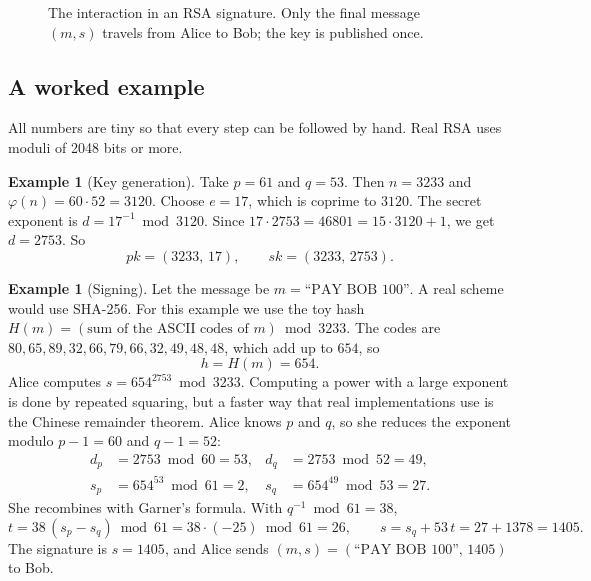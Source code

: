 \documentclass[11pt,a4paper]{article}
\theoremstyle{definition}
\newtheorem{example}[definition]{Example}
\newcommand{\sk}{\mathit{sk}}
\newcommand{\pk}{\mathit{pk}}
\newcommand{\Hash}{H}
\newcommand{\inv}[1]{#1^{-1}}
\begin{document}
\begin{figure}[h]
\centering
{}
\caption{The interaction in an RSA signature. Only the final message $(m,s)$ travels from Alice to Bob; the key is published once.}
\end{figure}

\subsection{A worked example}

All numbers are tiny so that every step can be followed by hand. Real RSA uses moduli of 2048 bits or more.

\begin{example}[Key generation]\label{ex:rsakey}
Take $p=61$ and $q=53$. Then $n=3233$ and $\varphi(n)=60\cdot 52=3120$. Choose $e=17$, which is coprime to $3120$. The secret exponent is $d=\inv{17} \bmod 3120$. Since $17\cdot 2753 = 46801 = 15\cdot 3120 + 1$, we get $d=2753$. So
\[
\pk=(3233,\,17),\qquad \sk=(3233,\,2753).
\]
\end{example}

\begin{example}[Signing]\label{ex:rsasign}
Let the message be $m=\text{``PAY BOB 100''}$. A real scheme would use SHA-256. For this example we use the toy hash $\Hash(m)=(\text{sum of the ASCII codes of } m) \bmod 3233$. The codes are $80,65,89,32,66,79,66,32,49,48,48$, which add up to $654$, so
\[
h = \Hash(m) = 654.
\]
Alice computes $s = 654^{2753} \bmod 3233$. Computing a power with a large exponent is done by repeated squaring, but a faster way that real implementations use is the Chinese remainder theorem. Alice knows $p$ and $q$, so she reduces the exponent modulo $p-1=60$ and $q-1=52$:
\begin{align*}
d_p &= 2753 \bmod 60 = 53, & d_q &= 2753 \bmod 52 = 49,\\
s_p &= 654^{53} \bmod 61 = 2, & s_q &= 654^{49} \bmod 53 = 27.
\end{align*}
She recombines with Garner's formula. With $q^{-1} \bmod 61 = 38$,
\[
t = 38\,(s_p - s_q) \bmod 61 = 38\cdot(-25) \bmod 61 = 26,\qquad s = s_q + 53\,t = 27 + 1378 = 1405.
\]
The signature is $s=1405$, and Alice sends $(m,s)=(\text{``PAY BOB 100''},\,1405)$ to Bob.
\end{example}
\end{document}
